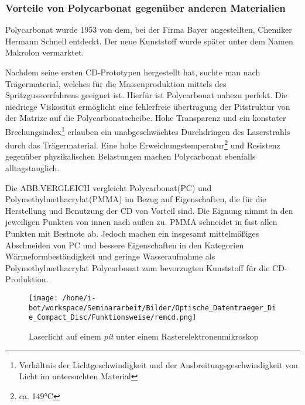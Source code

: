 \subsubsection{Vorteile von Polycarbonat gegenüber anderen Materialien}

Polycarbonat wurde 1953 von dem, bei der Firma Bayer angestellten, Chemiker
Hermann Schnell entdeckt. Der neue Kunststoff wurde später unter dem Namen
Makrolon\textsuperscript{\textregistered} vermarktet.

Nachdem seine ersten CD-Prototypen hergestellt hat, suchte man nach
Trägermaterial, welches für die Massenproduktion mittels des
Spritzgussverfahrens geeignet ist. Hierfür ist Polycarbonat nahezu perfekt. Die
niedriege Viskosität ermöglicht eine fehlerfreie übertragung der Pitstruktur von
der Matrize auf die Polycarbonatscheibe. Hohe Transparenz und ein konstater
Brechungsindex\footnote{Verhältnis der Lichtgeschwindigkeit und der
Ausbreitungsgeschwindigkeit von Licht im untersuchten Material} erlauben ein
unabgeschwächtes Durchdringen des Laserstrahls durch das Trägermaterial. Eine
hohe Erweichungstemperatur\footnote{ca. 149°C} und Resistenz gegenüber
physikalischen Belastungen machen Polycarbonat ebenfalls alltagstauglich.

Die ABB.VERGLEICH vergleicht Polycarbonat(PC) und Polymethylmethacrylat(PMMA) im
Bezug auf Eigenschaften, die für die Herstellung und Benutzung der CD von
Vorteil sind. Die Eignung nimmt in den jeweiligen Punkten von innen nach außen
zu. PMMA schneidet in fast allen Punkten mit Bestnote ab. Jedoch machen ein
insgesamt mittelmäßiges Abschneiden von PC und bessere Eigenschaften in den
Kategorien Wärmeformbeständigkeit und geringe Wasseraufnahme als
Polymethylmethacrylat Polycarbonat zum bevorzugten Kunststoff für die
CD-Produktion.


\begin{figure}[h]
  \begin{center}
      \begin{minipage}[t]{\textwidth}
        \begin{center}
            \texttt{[image: /home/i-bot/workspace/Seminararbeit/Bilder/Optische\_Datentraeger\_Die\_Compact\_Disc/Funktionsweise/remcd.png]}
            \caption[ \newline Roth, Klaus: CD, DVD0 \& Co.: Die Chemie der schillernden Scheiben, in: Chemie in unserer Zeit (41/2007), S. 340]{Laserlicht auf einem \textit{pit} unter einem Rasterelektronenmikroskop}
            \label{fig:cdrem}
        \end{center}
      \end{minipage}
  \end{center}
\end{figure}

